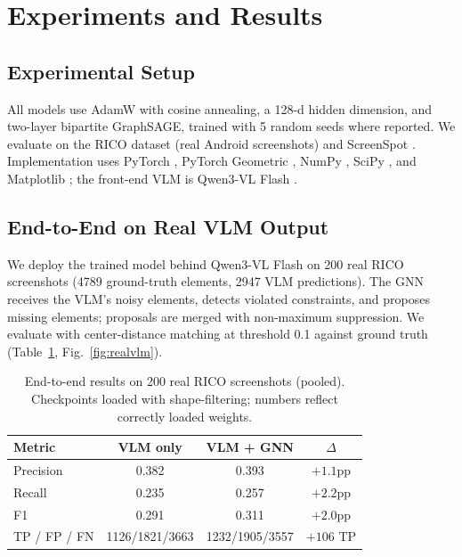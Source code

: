 \documentclass[11pt, letterpaper]{article}
\begin{document}
\section{Experiments and Results}
\subsection{Experimental Setup}
All models use AdamW with cosine annealing, a 128-d hidden dimension, and
two-layer bipartite GraphSAGE, trained with 5 random seeds where reported.
We evaluate on the RICO dataset \cite{dek.a17rico} (real Android screenshots)
and ScreenSpot \cite{cheng2024seclick}. Implementation uses
PyTorch \cite{paszke2019pytorch}, PyTorch Geometric \cite{fey2019pyg},
NumPy \cite{harris2020numpy}, SciPy \cite{virtanen2020scipy}, and
Matplotlib \cite{hunter2007matplotlib}; the front-end VLM is
Qwen3-VL Flash \cite{bai2023qwen}.

\subsection{End-to-End on Real VLM Output}\label{sec:endtoend}
We deploy the trained model behind Qwen3-VL Flash on 200 real RICO
screenshots (4789 ground-truth elements, 2947 VLM predictions). The GNN
receives the VLM's noisy elements, detects violated constraints, and proposes
missing elements; proposals are merged with non-maximum suppression. We
evaluate with center-distance matching at threshold 0.1 against ground truth
(Table~\ref{tab:real}, Fig.~\ref{fig:realvlm}).

\begin{table}[htbp]
\caption{End-to-end results on 200 real RICO screenshots (pooled).
Checkpoints loaded with shape-filtering; numbers reflect correctly loaded
weights.}
\label{tab:real}
\centering
\begin{tabularx}{\textwidth}{Xccc}
\toprule
\textbf{Metric} & \textbf{VLM only} & \textbf{VLM + GNN} & \textbf{$\Delta$} \\
\midrule
Precision & 0.382 & 0.393 & $+1.1$pp \\
Recall & 0.235 & 0.257 & $+2.2$pp \\
F1 & 0.291 & 0.311 & $+2.0$pp \\
TP / FP / FN & 1126/1821/3663 & 1232/1905/3557 & $+106$ TP \\
\bottomrule
\end{tabularx}
\end{table}
\end{document}
